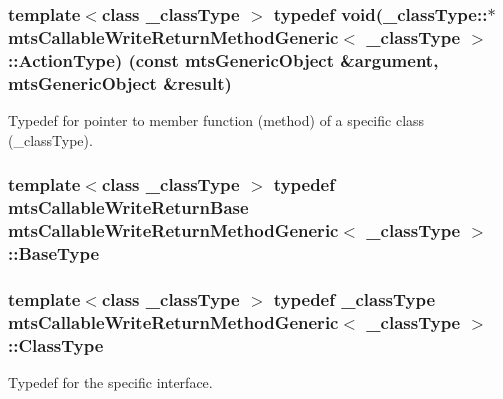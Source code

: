 \subsubsection[{Action\+Type}]{\setlength{\rightskip}{0pt plus 5cm}template$<$class \+\_\+class\+Type $>$ typedef void(\+\_\+class\+Type\+::$\ast$ {\bf mts\+Callable\+Write\+Return\+Method\+Generic}$<$ \+\_\+class\+Type $>$\+::Action\+Type) (const {\bf mts\+Generic\+Object} \&argument, {\bf mts\+Generic\+Object} \&result)}\label{classmts_callable_write_return_method_generic_ad1c87482f62321654e496a4e1929d93c}
Typedef for pointer to member function (method) of a specific class (\+\_\+class\+Type). \hypertarget{classmts_callable_write_return_method_generic_a45af3bcddc1608f32979dd6770b341ad}{}
\subsubsection[{Base\+Type}]{\setlength{\rightskip}{0pt plus 5cm}template$<$class \+\_\+class\+Type $>$ typedef {\bf mts\+Callable\+Write\+Return\+Base} {\bf mts\+Callable\+Write\+Return\+Method\+Generic}$<$ \+\_\+class\+Type $>$\+::{\bf Base\+Type}}\label{classmts_callable_write_return_method_generic_a45af3bcddc1608f32979dd6770b341ad}
\hypertarget{classmts_callable_write_return_method_generic_a32ecf59575aa52541be0693586a2319d}{}
\subsubsection[{Class\+Type}]{\setlength{\rightskip}{0pt plus 5cm}template$<$class \+\_\+class\+Type $>$ typedef \+\_\+class\+Type {\bf mts\+Callable\+Write\+Return\+Method\+Generic}$<$ \+\_\+class\+Type $>$\+::{\bf Class\+Type}}\label{classmts_callable_write_return_method_generic_a32ecf59575aa52541be0693586a2319d}
Typedef for the specific interface. \hypertarget{classmts_callable_write_return_method_generic_a628ed9547287aad4710fa55e37070f04}{}
